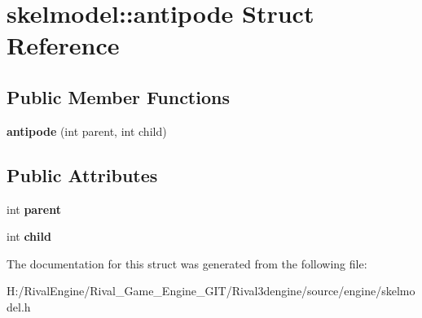 \hypertarget{structskelmodel_1_1antipode}{}\section{skelmodel\+:\+:antipode Struct Reference}
\label{structskelmodel_1_1antipode}
\subsection*{Public Member Functions}
\begin{DoxyCompactItemize}
\item 
\mbox{\label{structskelmodel_1_1antipode_a43a1e6da9d214c146dee2d3bd9fc6642}} 
{\bfseries antipode} (int parent, int child)
\end{DoxyCompactItemize}
\subsection*{Public Attributes}
\begin{DoxyCompactItemize}
\item 
\mbox{\label{structskelmodel_1_1antipode_ae7fb042cd5d2e57df2532838934d73b4}} 
int {\bfseries parent}
\item 
\mbox{\label{structskelmodel_1_1antipode_ae76395cd5641355c9ec936d1b415c308}} 
int {\bfseries child}
\end{DoxyCompactItemize}


The documentation for this struct was generated from the following file\+:\begin{DoxyCompactItemize}
\item 
H\+:/\+Rival\+Engine/\+Rival\+\_\+\+Game\+\_\+\+Engine\+\_\+\+G\+I\+T/\+Rival3dengine/source/engine/skelmodel.\+h\end{DoxyCompactItemize}
